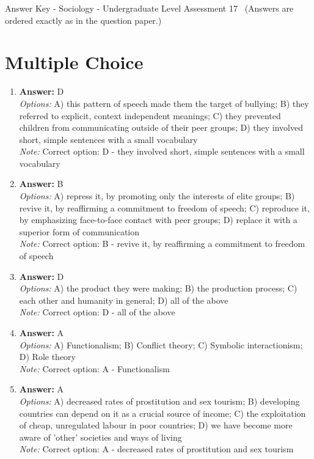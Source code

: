 \documentclass[12pt]{article}
\begin{document}
\begin{center}
Answer Key - Sociology - Undergraduate Level Assessment 17 \
\small (Answers are ordered exactly as in the question paper.)
\end{center}

\section*{Multiple Choice}
\begin{enumerate}[label=\arabic*.]
\item \textbf{Answer:} D
\\ \textit{Options:} A) this pattern of speech made them the target of bullying; B) they referred to explicit, context independent meanings; C) they prevented children from communicating outside of their peer groups; D) they involved short, simple sentences with a small vocabulary
\\ \textit{Note:} Correct option: D - they involved short, simple sentences with a small vocabulary
\item \textbf{Answer:} B
\\ \textit{Options:} A) repress it, by promoting only the interests of elite groups; B) revive it, by reaffirming a commitment to freedom of speech; C) reproduce it, by emphasizing face-to-face contact with peer groups; D) replace it with a superior form of communication
\\ \textit{Note:} Correct option: B - revive it, by reaffirming a commitment to freedom of speech
\item \textbf{Answer:} D
\\ \textit{Options:} A) the product they were making; B) the production process; C) each other and humanity in general; D) all of the above
\\ \textit{Note:} Correct option: D - all of the above
\item \textbf{Answer:} A
\\ \textit{Options:} A) Functionalism; B) Conflict theory; C) Symbolic interactionism; D) Role theory
\\ \textit{Note:} Correct option: A - Functionalism
\item \textbf{Answer:} A
\\ \textit{Options:} A) decreased rates of prostitution and sex tourism; B) developing countries can depend on it as a crucial source of income; C) the exploitation of cheap, unregulated labour in poor countries; D) we have become more aware of 'other' societies and ways of living
\\ \textit{Note:} Correct option: A - decreased rates of prostitution and sex tourism
\end{enumerate}
\end{document}
